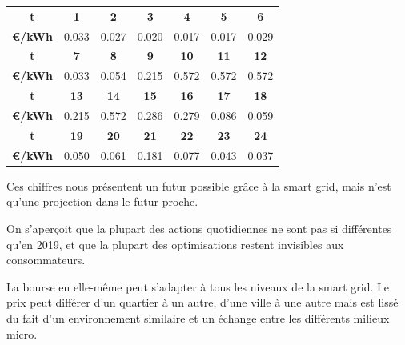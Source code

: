 \begin{tabular}{ | c | c | c | c | c | c | c | }
  \hline
  \textbf{t} & \textbf{1} & \textbf{2} & \textbf{3} & \textbf{4} & \textbf{5} & \textbf{6} \\
  \textbf{€/kWh} & 0.033 & 0.027 & 0.020 & 0.017 & 0.017 & 0.029 \\
  \hline
  \textbf{t} & \textbf{7} & \textbf{8} & \textbf{9} & \textbf{10} & \textbf{11} & \textbf{12} \\
  \textbf{€/kWh} & 0.033 & 0.054 & 0.215 & 0.572 & 0.572 & 0.572 \\
  \hline
  \textbf{t} & \textbf{13} & \textbf{14} & \textbf{15} & \textbf{16} & \textbf{17} & \textbf{18} \\
  \textbf{€/kWh} & 0.215 & 0.572 & 0.286 & 0.279 & 0.086 & 0.059 \\
  \hline
  \textbf{t} & \textbf{19} & \textbf{20} & \textbf{21} & \textbf{22} & \textbf{23} & \textbf{24} \\
  \textbf{€/kWh} & 0.050 & 0.061 & 0.181 & 0.077 & 0.043 & 0.037 \\
  \hline
\end{tabular}


Ces chiffres nous présentent un futur possible grâce à la smart grid, mais n'est qu'une projection dans le futur proche.

On s'aperçoit que la plupart des actions quotidiennes ne sont pas si différentes qu'en 2019, et que la plupart des
optimisations restent invisibles aux consommateurs.

La bourse en elle-même peut s'adapter à tous les niveaux de la smart grid. Le prix peut différer d'un quartier à un autre,
d'une ville à une autre mais est lissé du fait d'un environnement similaire et un échange entre les différents milieux micro.

